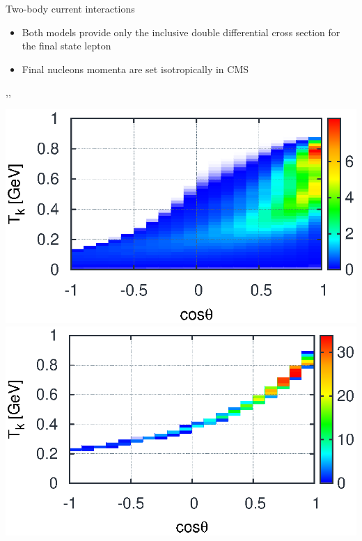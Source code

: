\begin{wideslide}[toc=]{Two-body current interactions}
\null\vfill

  \begin{itemize}
    \item Both models provide only the inclusive double differential cross section for the final state lepton
    \item Final nucleons momenta are set isotropically in CMS
  \end{itemize}

  \sep\sep
  
  \twocolumn
  {
    \includegraphics[width=\columnwidth]{figures/mec_lep_nieves.eps}
  }
  {
    \includegraphics[width=\columnwidth]{figures/mec_lep_tem.eps}
  }


\vfill\null
\end{wideslide}

